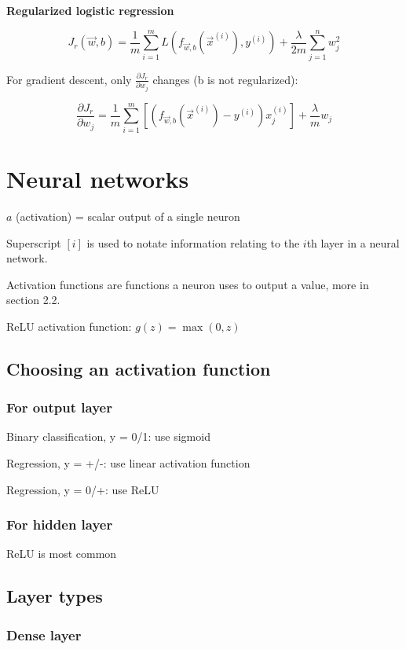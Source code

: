 \documentclass[12pt]{article}
\begin{document}
\noindent \textbf{Regularized logistic regression}

\[ J_r(\vec{w},b) = \frac{1}{m} \sum_{i=1}^m L(f_{\vec{w},b}(\vec{x}^{(i)}), y^{(i)}) + \frac{\lambda}{2m} \sum_{j=1}^n w_j^2 \]

For gradient descent, only $\frac{\partial J_r}{\partial w_j}$ changes (b is not regularized):

\[ \frac{\partial J_r}{\partial w_j} = \frac{1}{m} \sum_{i=1}^m \left[(f_{\vec{w},b}(\vec{x}^{(i)}) - y^{(i)})x_j^{(i)}\right] + \frac{\lambda}{m} w_j \]

\pagebreak

\section{Neural networks}

$a$ (activation) = scalar output of a single neuron

Superscript $[i]$ is used to notate information relating to the $i$th layer in a neural network.

Activation functions are functions a neuron uses to output a value, more in section 2.2.

ReLU activation function: $g(z) = \max(0, z)$

\subsection{Choosing an activation function}

\subsubsection*{For output layer}

Binary classification, y = 0/1: use sigmoid

Regression, y = +/-: use linear activation function

Regression, y = 0/+: use ReLU

\subsubsection*{For hidden layer}

ReLU is most common

\subsection{Layer types}

\subsubsection*{Dense layer}
\end{document}
